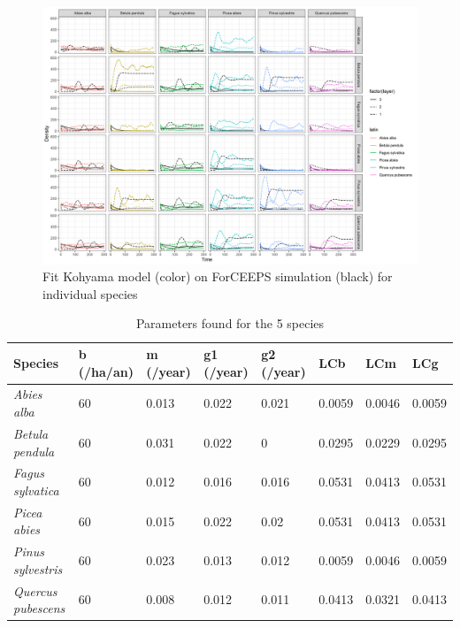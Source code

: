 \documentclass{article}
\begin{document}
\begin{figure}
    \includegraphics[width=\textwidth]{Figure/Parametrisation/Simulation_fit.png}
    \caption{Fit Kohyama model (color) on ForCEEPS simulation (black) for individual species}
    \label{fig:Simulation_fit}
\end{figure}

\begin{table}[H]
\begin{center}
    \begin{tabular}{llllllll}
    \hline
    Species & b (/ha/an) & m (/year) & g1 (/year) & g2 (/year) & LCb & LCm & LCg \\ \hline
    \textit{Abies alba}       & 60 & 0.013 & 0.022 & 0.021 & 0.0059 & 0.0046 & 0.0059 \\
    \textit{Betula pendula}   & 60 & 0.031 & 0.022 & 0     & 0.0295 & 0.0229 & 0.0295 \\
    \textit{Fagus sylvatica}  & 60 & 0.012 & 0.016 & 0.016 & 0.0531 & 0.0413 & 0.0531 \\
    \textit{Picea abies}      & 60 & 0.015 & 0.022 & 0.02  & 0.0531 & 0.0413 & 0.0531 \\
    \textit{Pinus sylvestris} & 60 & 0.023 & 0.013 & 0.012 & 0.0059 & 0.0046 & 0.0059 \\
    \textit{Quercus pubescens}& 60 & 0.008 & 0.012 & 0.011 & 0.0413 & 0.0321 & 0.0413 \\ \hline
    \end{tabular}
    \caption{Parameters found for the 5 species}
    \label{tab:Final_param}
\end{center}
\end{table}
\end{document}
